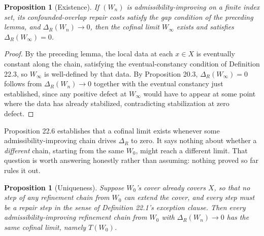 \documentclass[11pt]{book}
\newtheorem{proposition}[theorem]{Proposition}
\begin{document}
\begin{proposition}[Existence]
If $(W_n)$ is admissibility-improving on a finite index set, its confounded-overlap repair costs satisfy the gap condition of the preceding lemma, and $\Delta_R(W_n) \to 0$, then the cofinal limit $W_\infty$ exists and satisfies $\Delta_R(W_\infty) = 0$.
\end{proposition}

\begin{proof}
By the preceding lemma, the local data at each $x \in X$ is eventually constant along the chain, satisfying the eventual-constancy condition of Definition 22.3, so $W_\infty$ is well-defined by that data. By Proposition 20.3, $\Delta_R(W_\infty) = 0$ follows from $\Delta_R(W_n) \to 0$ together with the eventual constancy just established, since any positive defect at $W_\infty$ would have to appear at some point where the data has already stabilized, contradicting stabilization at zero defect.
\end{proof}

Proposition 22.6 establishes that a cofinal limit exists whenever some admissibility-improving chain drives $\Delta_R$ to zero. It says nothing about whether a \emph{different} chain, starting from the same $W_0$, might reach a different limit. That question is worth answering honestly rather than assuming: nothing proved so far rules it out.

\begin{proposition}[Uniqueness]
Suppose $W_0$'s cover already covers $X$, so that no step of any refinement chain from $W_0$ can extend the cover, and every step must be a repair step in the sense of Definition 22.1's exception clause. Then every admissibility-improving refinement chain from $W_0$ with $\Delta_R(W_n) \to 0$ has the same cofinal limit, namely $T(W_0)$.
\end{proposition}
\end{document}
